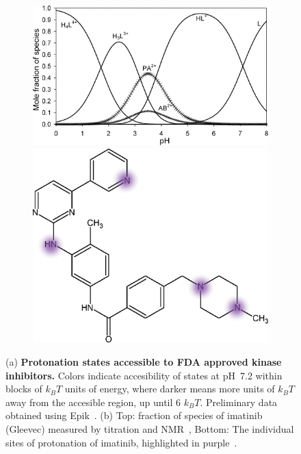 \documentclass[10pt,final]{article}
\newcommand{\pH}{p$\mathrm{H}$\ }
\begin{document}
\begin{figure}[H]
\begin{subfigure}{.48\textwidth}
  \centering
  \includegraphics[width=0.95\linewidth]{figures/imatinib_curve.png}
  \includegraphics[width=0.95\linewidth]{figures/imatinib_groups.png}
  \caption{}
  \label{figure:imatinib-pKa}
\end{subfigure}
\caption{(a) \textbf{Protonation states accessible to FDA approved kinase inhibitors.} Colors indicate accesibility of states at \pH 7.2 within blocks of $k_BT$ units of energy, where darker means more units of $k_BT$ away from the accesible region, up until 6 $k_BT$. Preliminary data obtained using Epik~\autocite{Shelley2007a,Greenwood2010a}. (b) Top: fraction of species of imatinib (Gleevec) measured by titration and NMR~\autocite{Szakacs2005a}, Bottom: The individual sites of protonation of imatinib, highlighted in purple~\autocite{Szakacs2005a}.}
\label{figure:kinase-pKa}
\end{figure}
\end{document}

